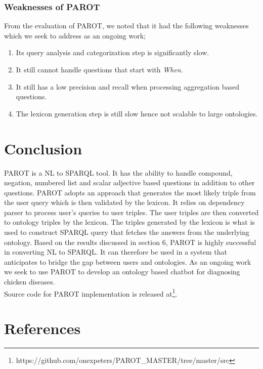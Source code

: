 \documentclass[review]{elsarticle}
\begin{document}
\subsubsection{Weaknesses of PAROT}
From the evaluation of PAROT, we noted that it had the following weaknesses which we seek to address as an ongoing work;
\begin{enumerate}
\item Its query analysis and categorization step is significantly slow.
\item It still cannot handle questions that start with \textit{When}.
\item It still has a low precision and recall when processing  aggregation based questions.
\item The lexicon generation step is still slow hence not scalable to large ontologies.
\end{enumerate}
\section{Conclusion}
PAROT is a NL to SPARQL tool. It has the ability to handle compound, negation, numbered list and scalar adjective based questions in addition to other questions. PAROT adopts an approach that generates the most likely triple from the user query which is then validated by the lexicon. It relies on dependency parser to process user's queries to user triples. The user triples are then converted to ontology triples by the lexicon. The triples generated by the lexicon is what is used to construct SPARQL query that fetches the answers from the  underlying ontology. Based on the results discussed in section 6, PAROT is highly successful in converting NL to SPARQL. It can therefore be used in a system that anticipates to bridge the gap between users and ontologies. As an ongoing work we seek to use PAROT to develop an ontology based chatbot for diagnosing chicken diseases.\\
Source code for PAROT implementation is released at\footnote{https://github.com/onexpeters/PAROT\_MASTER/tree/master/src}.

\section*{References}

  
\end{document}
